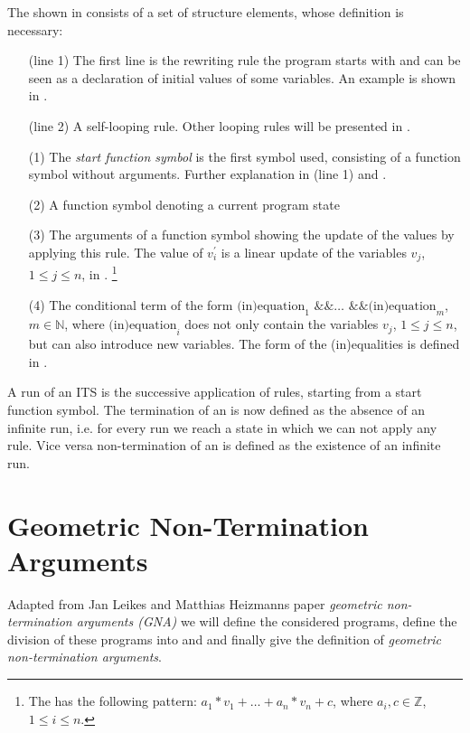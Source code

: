 The \its shown in  consists of a set of structure elements, whose definition is necessary:
\begin{enumerate}[leftmargin=1]
	\item[(line 1)] The first line is the rewriting rule the program starts with and can be seen as a declaration of initial values of some variables. An example is shown in .
	\item[(line 2)] A self-looping rule. Other looping rules will be presented in .
	\item[(1)] The \textit{start function symbol} is the first symbol used, consisting of a function symbol without arguments. Further explanation in (line 1) and .
	\item[(2)] A function symbol denoting a current program state
	\item[(3)] The arguments of a function symbol showing the update of the values by applying this rule. The value of $v^\prime_i$ is a linear update of the variables $v_j$, $1 \le j \le n$, in \stdLinInt. \footnote{The \stdLinInt has the following pattern: $ a_1*v_1 + \dots + a_n*v_n + c$, where $a_i , c \in \mathbb{Z}$, $1 \le i\le n$. }
	\item[(4)] The conditional term of the form $\text{(in)equation}_1 \text{ \&\& } \dots \text{ \&\& } \text{(in)equation}_m$, $m \in \mathbb{N}$, where $\text{(in)equation}_i$ does not only contain the variables $v_j$, $1 \le j \le n$, but can also introduce new variables. The form of the (in)equalities is defined in .	
\end{enumerate} 

A run of an ITS is the successive application of rules, starting from a start function symbol.
The termination of an \its is now defined as the absence of an infinite run, i.e. for every run we reach a state in which we can not apply any rule. Vice versa non-termination of an \its is defined as the existence of an infinite run.


\section{Geometric Non-Termination Arguments}
Adapted from Jan Leikes and Matthias Heizmanns paper \textit{geometric non-termination arguments (GNA)} \cite{leike2014geometric} we will define the considered programs, define the division of these programs into \stem and \loopt and finally give the definition of \textit{geometric non-termination arguments}.

